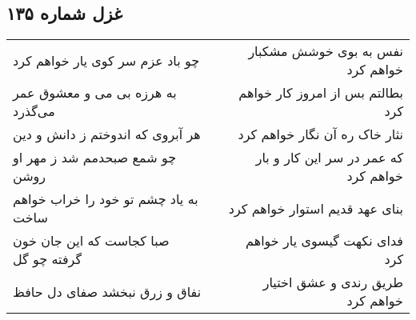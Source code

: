 \begin{center}
\section*{غزل شماره ۱۳۵}
\label{sec:sh135}
\begin{longtable}{l p{0.5cm} r}
چو باد عزم سر کوی یار خواهم کرد
&&
نفس به بوی خوشش مشکبار خواهم کرد
\\
به هرزه بی می و معشوق عمر می‌گذرد
&&
بطالتم بس از امروز کار خواهم کرد
\\
هر آبروی که اندوختم ز دانش و دین
&&
نثار خاک ره آن نگار خواهم کرد
\\
چو شمع صبحدمم شد ز مهر او روشن
&&
که عمر در سر این کار و بار خواهم کرد
\\
به یاد چشم تو خود را خراب خواهم ساخت
&&
بنای عهد قدیم استوار خواهم کرد
\\
صبا کجاست که این جان خون گرفته چو گل
&&
فدای نکهت گیسوی یار خواهم کرد
\\
نفاق و زرق نبخشد صفای دل حافظ
&&
طریق رندی و عشق اختیار خواهم کرد
\\
\end{longtable}
\end{center}
